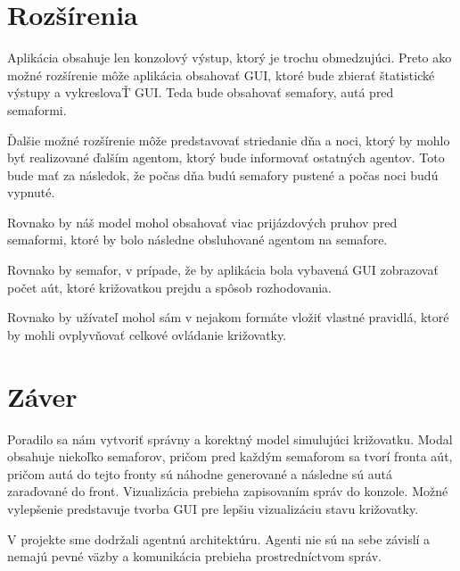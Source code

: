 \documentclass[12pt,a4paper,titlepage,final]{article}
\begin{document}
\newpage
\section{Rozšírenia}
Aplikácia obsahuje len konzolový výstup, ktorý je trochu obmedzujúci. Preto ako možné rozšírenie môže aplikácia obsahovať GUI, ktoré bude zbierať štatistické výstupy a vykreslovaŤ GUI. Teda bude obsahovať semafory, autá pred semaformi. 

Ďalšie možné rozšírenie môže predstavovať striedanie dňa a noci, ktorý by mohlo byť realizované ďalším agentom, ktorý bude informovať ostatných agentov. Toto bude mať za následok, že počas dňa budú semafory pustené a počas noci budú vypnuté.

Rovnako by náš model mohol obsahovať viac prijázdových pruhov pred semaformi, ktoré by bolo následne obsluhované agentom na semafore.

Rovnako by semafor, v prípade, že by aplikácia bola vybavená GUI zobrazovať počet aút, ktoré križovatkou prejdu a spôsob rozhodovania.

Rovnako by užívateľ mohol sám v nejakom formáte vložiť vlastné pravidlá, ktoré by mohli ovplyvňovať celkové ovládanie križovatky.




\newpage
\section{Záver}
Poradilo sa nám vytvoriť správny a korektný model simulujúci križovatku. Modal obsahuje niekoľko semaforov, pričom pred každým semaforom sa tvorí fronta aút, pričom autá do tejto fronty sú náhodne generované a následne sú autá zaraďované do front. Vizualizácia prebieha zapisovaním správ do konzole. Možné vylepšenie predstavuje tvorba GUI pre lepšiu vizualizáciu stavu križovatky. 

V projekte sme dodržali agentnú architektúru. Agenti nie sú na sebe závislí a nemajú pevné väzby a komunikácia prebieha prostredníctvom správ.
\end{document}
